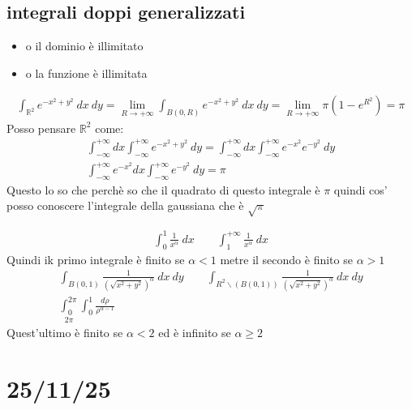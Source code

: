 \documentclass[a4paper, oneside]{article}
\begin{document}
    \subsection{integrali doppi generalizzati}
    \begin{itemize}
        \item o il dominio è illimitato
        \item o la funzione è illimitata
    \end{itemize}
    \begin{example}
        \begin{gather*}
            \int_{\mathbb{R}^2} e^{-x^2+y^2} \ dx \ dy = \lim_{R \to +\infty} \int_{B(0,R)} e^{-x^2+y^2} \ dx \ dy = \lim_{R \to +\infty} \pi (1-e^{R^2}) = \pi 
        \end{gather*}
        Posso pensare $\mathbb{R}^2$ come:
        \begin{gather*}
            \int_{-\infty}^{+\infty} dx \int_{-\infty}^{+\infty} e^{-x^2+y^2} \ dy = \int_{-\infty}^{+\infty} dx \int_{-\infty}^{+\infty} e^{-x^2} e^{-y^2} \ dy \\
            \int_{-\infty}^{+\infty} e^{-x^2} dx \int_{-\infty}^{+\infty} e^{-y^2} \ dy = \pi 
        \end{gather*}
        Questo lo so che perchè so che il quadrato di questo integrale è $\pi$ quindi cos' posso conoscere l'integrale della gaussiana che è $\sqrt{\pi}$
    \end{example}
    \begin{example}
        \begin{gather*}
            \int_{0}^{1} \frac{1}{x^\alpha} \ dx \qquad \int_{1}^{+\infty} \frac{1}{x^\alpha} \ dx 
        \end{gather*}
        Quindi ik primo integrale è finito se $\alpha < 1$ metre il secondo è finito se $\alpha > 1$
        \begin{gather*}
            \int_{B(0,1)} \frac{1}{(\sqrt{x^2+y^2})^\alpha} \ dx \ dy \qquad \int_{R^2\backslash(B(0,1))} \frac{1}{(\sqrt{x^2+y^2})^\alpha }\ dx \ dy\\
            \underset{2\pi}{\int_{0}^{2\pi}} \int_{0}^{1} \frac{d\rho}{\rho^{\alpha-1}}
        \end{gather*}
        Quest'ultimo è finito se $\alpha < 2$ ed è infinito se $\alpha \geq 2$
    \end{example}



\section{25/11/25}
\end{document}
